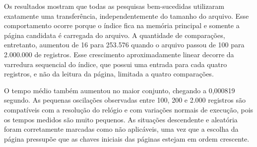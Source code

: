 \documentclass[12pt,a4paper]{article}
\begin{document}
\begin{table}[H]
\centering
\caption{Desempenho do método de Acesso Sequencial Indexado}
\label{tab:asi}
\end{table}

Os resultados mostram que todas as pesquisas bem-sucedidas utilizaram exatamente uma
transferência, independentemente do tamanho do arquivo. Esse comportamento ocorre
porque o índice fica na memória principal e somente a página candidata é carregada do
arquivo. A quantidade de comparações, entretanto, aumentou de 16 para 253.576 quando o
arquivo passou de 100 para 2.000.000 de registros. Esse crescimento aproximadamente
linear decorre da varredura sequencial do índice, que possui uma entrada para cada
quatro registros, e não da leitura da página, limitada a quatro comparações.

O tempo médio também aumentou no maior conjunto, chegando a 0,000819 segundo. As
pequenas oscilações observadas entre 100, 200 e 2.000 registros são compatíveis com a
resolução do relógio e com variações normais de execução, pois os tempos medidos são
muito pequenos. As situações descendente e aleatória foram corretamente marcadas como
não aplicáveis, uma vez que a escolha da página pressupõe que as chaves iniciais das
páginas estejam em ordem crescente.
\end{document}
